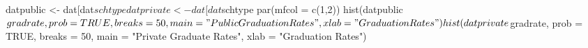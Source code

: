 \begin{Schunk}
\begin{Sinput}
 datpublic  <- dat[dat$schtype %in% levels(dat$schtype)[1], ]
 datprivate <- dat[dat$schtype %in% levels(dat$schtype)[2], ]
 par(mfcol = c(1,2))
 hist(datpublic$gradrate, prob = TRUE, breaks = 50, main = "Public Graduation Rates", xlab = "Graduation Rates")
 hist(datprivate$gradrate, prob = TRUE, breaks = 50, main = "Private Graduate Rates", xlab = "Graduation Rates")
\end{Sinput}
\end{Schunk}
